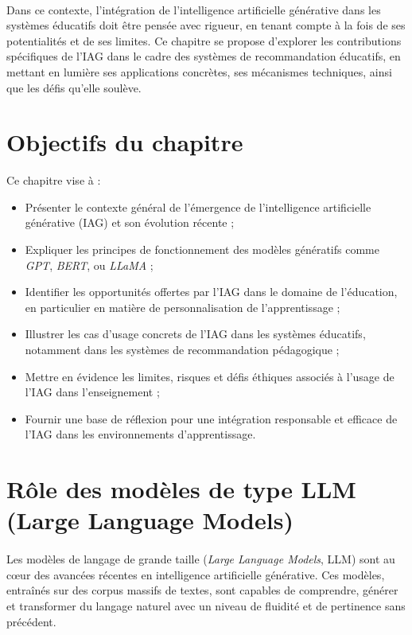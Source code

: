 \paragraph{}
Dans ce contexte, l’intégration de l’intelligence artificielle générative dans les systèmes éducatifs doit être pensée avec rigueur, en tenant compte à la fois de ses potentialités et de ses limites. Ce chapitre se propose d’explorer les contributions spécifiques de l’IAG dans le cadre des systèmes de recommandation éducatifs, en mettant en lumière ses applications concrètes, ses mécanismes techniques, ainsi que les défis qu’elle soulève.

\section*{Objectifs du chapitre}

Ce chapitre vise à :

\begin{itemize}
  \item Présenter le contexte général de l’émergence de l’intelligence artificielle générative (IAG) et son évolution récente ;
  \item Expliquer les principes de fonctionnement des modèles génératifs comme \textit{GPT}, \textit{BERT}, ou \textit{LLaMA} ;
  \item Identifier les opportunités offertes par l’IAG dans le domaine de l’éducation, en particulier en matière de personnalisation de l’apprentissage ;
  \item Illustrer les cas d’usage concrets de l’IAG dans les systèmes éducatifs, notamment dans les systèmes de recommandation pédagogique ;
  \item Mettre en évidence les limites, risques et défis éthiques associés à l’usage de l’IAG dans l’enseignement ;
  \item Fournir une base de réflexion pour une intégration responsable et efficace de l’IAG dans les environnements d’apprentissage.
\end{itemize}

\section*{Rôle des modèles de type LLM (Large Language Models)}

\paragraph{}
Les modèles de langage de grande taille (\textit{Large Language Models}, LLM) sont au cœur des avancées récentes en intelligence artificielle générative. Ces modèles, entraînés sur des corpus massifs de textes, sont capables de comprendre, générer et transformer du langage naturel avec un niveau de fluidité et de pertinence sans précédent.

